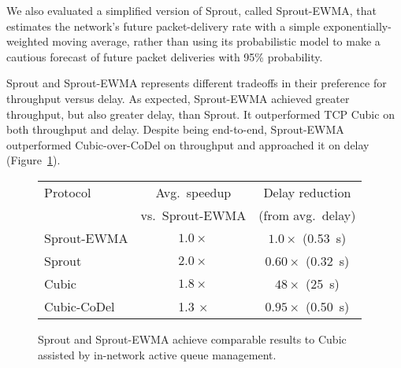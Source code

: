 We also evaluated a simplified version of Sprout, called Sprout-EWMA,
that estimates the network's future packet-delivery rate with a simple
exponentially-weighted moving average, rather than using its
probabilistic model to make a cautious forecast of future packet
deliveries with 95\% probability.

Sprout and Sprout-EWMA represents different tradeoffs in their
preference for throughput versus delay.  As expected, Sprout-EWMA
achieved greater throughput, but also greater delay, than Sprout. It
outperformed TCP Cubic on both throughput and delay. Despite being
end-to-end, Sprout-EWMA outperformed Cubic-over-CoDel on throughput
and approached it on delay (Figure~\ref{f:sproutvsaqm}).

\begin{figure}
\caption{Sprout and Sprout-EWMA achieve comparable results to Cubic
  assisted by in-network active queue management.}
\label{f:sproutvsaqm}

\begin{center}
\noindent \begin{tabular}{|l|c|c|}
\hline
Protocol & Avg.~speedup & Delay reduction \\
& \footnotesize{vs.~Sprout-EWMA} & \footnotesize{(from avg.~delay)}\\
\hline
\hline
\cellcolor{blue!20}Sprout-EWMA & \cellcolor{blue!20}$1.0\times$ & \cellcolor{blue!20}$1.0\times$ (0.53~s) \\
\hline
Sprout & $2.0\times$ & \cellcolor{red!20}$0.60\times$ (0.32~s) \\
Cubic & $1.8\times$ & $48 \times$ (25~s)\\
\hline
Cubic-CoDel & 1.3 $\times$ & \cellcolor{red!20}$0.95\times$ (0.50~s)\\
\hline
\end{tabular}

\end{center}

\end{figure}


